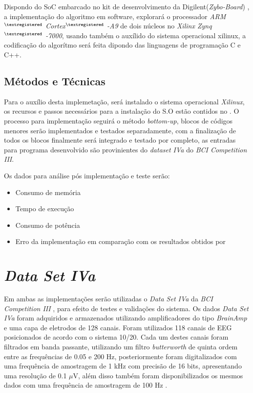 Dispondo do SoC embarcado no kit de desenvolvimento da Digilent(\textit{Zybo-Board}) , a implementação do algoritmo em 
software, explorará o processador \textit{ARM$^{\textregistered}$  Cortex$^{\textregistered}$ -A9} de dois núcleos no \textit{Xilinx Zynq$^{\textregistered}$ -7000}, usando também
o auxílido do sistema operacional xilinux, a codificação do algorítmo será feita dipondo das linguagens de programação
C e C++.

\subsection{Métodos e Técnicas}
 
Para o auxílio desta implemetação, será instalado o sistema operacional \textit{Xilinux}, os recursos e passos necessários
para a instalação do S.O estão contidos no \cite{zynqBook}.
O processo para implementação seguirá o método \textit{bottom-up}, blocos de códigos menores serão implementados e testados
separadamente, com a finalização de todos os blocos finalmente será integrado e testado por completo, as entradas
para programa desenvolvido são provinientes do \textit{dataset IVa} do \textit{BCI Competition III}.

 
Os dados para análise pós implementação e teste serão:
\begin{itemize}[noitemsep]
\item Consumo de memória
\item Tempo de execução
\item Consumo de potência
\item Erro da implementação em comparação com os resultados obtidos por \cite{F.Lotte}
\end{itemize}













\section{\textit{Data Set IVa}}

Em ambas as implementações serão utilizadas o \textit{Data Set IVa} da \textit{BCI Competition III} \cite{BCICompetition}, para efeito de testes e validações do sistema.
Os dados \textit{Data Set IVa} foram adquiridos e armazenados utilizando amplificadores do tipo \textit{BrainAmp} e uma capa de eletrodos de 128 canais. Foram utilizados 118 canais de EEG posicionados de acordo com o sistema 10/20. Cada um destes canais foram filtrados em banda passante, utilizando um filtro \textit{butterworth} de quinta ordem entre as frequências de 0.05 e 200 Hz, posteriormente foram digitalizados com uma frequência de amostragem de 1 kHz com precisão de 16 bits, apresentando uma resolução de 0.1 $\mu$V, além disso também foram disponibilizados os mesmos dados com uma frequência de amostragem de 100 Hz \cite{siteBCI}.


